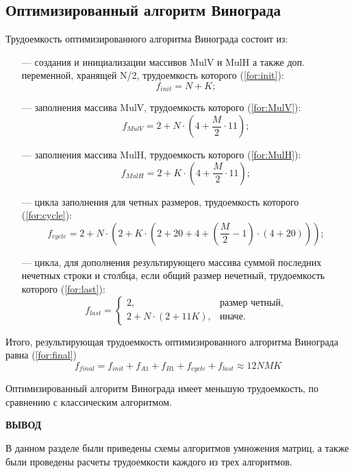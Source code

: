 \subsection{Оптимизированный алгоритм Винограда}
Трудоемкость оптимизированного алгоритма Винограда состоит из:
\begin{itemize}
	\item[---] создания и инициализации массивов MulV и MulH а также доп. переменной, хранящей N/2, трудоемкость которого (\ref{for:init}):
	\begin{equation}
		\label{for:init}
		f_{init} = N + K;
	\end{equation}
	
	\item[---] заполнения массива MulV, трудоемкость которого (\ref{for:MulV}):
	\begin{equation}
		\label{for:MulV}
		f_{MulV} = 2 + N \cdot (4 + \frac{M}{2} \cdot 11);
	\end{equation}
	
	\item[---] заполнения массива MulH, трудоемкость которого (\ref{for:MulH}):
	\begin{equation}
		\label{for:MulH}
		f_{MulH} = 2 + K \cdot (4 + \frac{M}{2} \cdot 11);
	\end{equation}
	
	\item[---] цикла заполнения для четных размеров, трудоемкость которого (\ref{for:cycle}):
	\begin{equation}
		\label{for:cycle}
		f_{cycle} = 2 + N \cdot (2 + K \cdot (2 + 20 + 4 + (\frac{M}{2} - 1) \cdot (4 + 20)));
	\end{equation}
	\item[---] цикла, для дополнения результирующего массива суммой последних нечетных строки и столбца, если общий размер нечетный, трудоемкость которого (\ref{for:last}):
	\begin{equation}
		\label{for:last}
		f_{last} = \begin{cases}
			2, & \text{размер четный,}\\
			2 + N \cdot (2 + 11K), & \text{иначе.}
		\end{cases}
	\end{equation}
\end{itemize}

Итого, результирующая трудоемкость оптимизированного алгоритма Винограда равна (\ref{for:final})
\begin{equation}
	\label{for:final}
	f_{final} = f_{init} + f_{A1} + f_{B1} + f_{cycle} + f_{last} \approx 12NMK
\end{equation}

Оптимизированный алгоритм Винограда имеет меньшую трудоемкость, по сравнению с классическим алгоритмом.

\vspace{5mm}

\textbf{ВЫВОД}

В данном разделе были приведены схемы алгоритмов умножения матриц, а также были проведены расчеты трудоемкости каждого из трех алгоритмов.

\clearpage